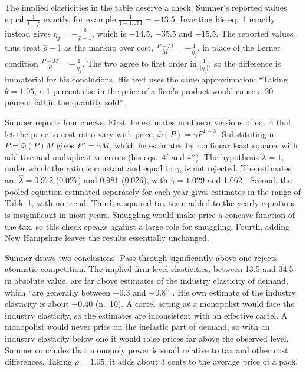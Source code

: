 The implied elasticities in the table deserve a check. Sumner's reported values equal $\frac{1}{1 - \hat\rho}$
exactly, for example $\frac{1}{1 - 1.074} = -13.5$. Inverting his eq.~1 exactly instead gives
$\eta_j = -\frac{\hat\rho}{\hat\rho - 1}$, which is $-14.5$, $-35.5$ and $-15.5$. The reported values thus treat
$\hat\rho - 1$ as the markup over cost, $\frac{P - M}{M} = -\frac{1}{\eta_j}$, in place of the Lerner condition
$\frac{P - M}{P} = -\frac{1}{\eta_j}$. The two agree to first order in $\frac{1}{\lvert\eta_j\rvert}$, so the
difference is immaterial for his conclusions. His text uses the same approximation: ``Taking $\theta = 1.05$, a 1
percent rise in the price of a firm's product would cause a 20 percent fall in the quantity sold'' \citep[p.~1019]{Sumner1981}.

Sumner reports four checks. First, he estimates nonlinear versions of eq.~4 that let the price-to-cost ratio vary with
price, $\bar\omega(P) = \gamma P^{1 - \lambda}$. Substituting in $P = \bar\omega(P) M$ gives $P^{\lambda} = \gamma M$,
which he estimates by nonlinear least squares with additive and multiplicative errors (his eqs.~4$'$ and 4$''$). The
hypothesis $\lambda = 1$, under which the ratio is constant and equal to $\gamma$, is not rejected. The estimates are
$\hat\lambda = 0.972$ (0.027) and 0.981 (0.026), with $\hat\gamma = 1.029$ and 1.062 \citep[n.~9]{Sumner1981}.
Second, the pooled equation estimated separately for each year gives estimates in the range of Table 1, with no trend.
Third, a squared tax term added to the yearly equations is insignificant in most years. Smuggling would make price a
concave function of the tax, so this check speaks against a large role for smuggling. Fourth, adding New Hampshire
leaves the results essentially unchanged.

Sumner draws two conclusions. Pass-through significantly above one rejects atomistic competition. The implied
firm-level elasticities, between 13.5 and 34.5 in absolute value, are far above estimates of the industry elasticity
of demand, which ``are generally between $-0.3$ and $-0.8$'' \citep[p.~1017]{Sumner1981}. His own estimate of the
industry elasticity is about $-0.40$ (n.~10). A cartel acting as a monopolist would face the industry elasticity, so
the estimates are inconsistent with an effective cartel. A monopolist would never price on the inelastic part of
demand, so with an industry elasticity below one it would raise prices far above the observed level. Sumner concludes
that monopoly power is small relative to tax and other cost differences. Taking $\rho = 1.05$, it adds about 3 cents
to the average price of a pack.

